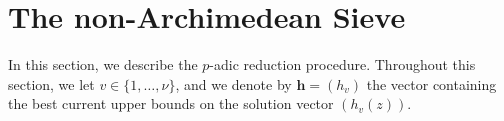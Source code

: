 \documentclass[11pt]{report}
\newtheorem{lemma}[theorem]{Lemma}
\theoremstyle{definition}
\DeclareMathOperator{\ord}{ord}
\begin{document}
%
%
%
%


\section{The non-Archimedean Sieve}
\label{sec:nonArchSieve}

In this section, we describe the $p$-adic reduction procedure. Throughout this section, we let $v \in \{1, \dots, \nu\}$, and we denote by $\mathbf{h} = (h_v)$ the vector containing the best current upper bounds on the solution vector $(h_v(z))$.
\end{document}
